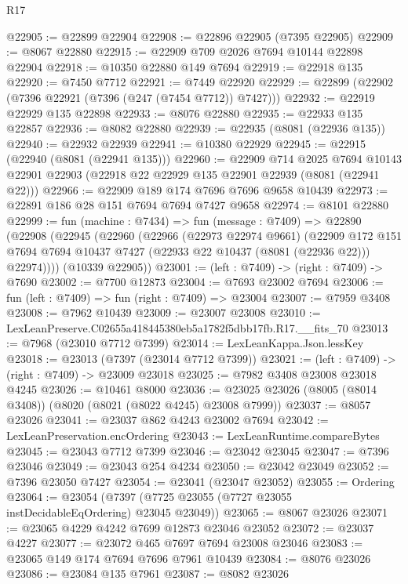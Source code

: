 \begin{lexlean}{R17}
\begin{coremodule}
@22905 := @22899 @22904
@22908 := @22896 @22905 (@7395 @22905)
@22909 := @8067 @22880
@22915 := @22909 @709 @2026 @7694 @10144 @22898 @22904
@22918 := @10350 @22880 @149 @7694
@22919 := @22918 @135
@22920 := @7450 @7712
@22921 := @7449 @22920
@22929 := @22899 (@22902 (@7396 @22921 (@7396 (@247 (@7454 @7712)) @7427)))
@22932 := @22919 @22929 @135 @22898
@22933 := @8076 @22880
@22935 := @22933 @135 @22857
@22936 := @8082 @22880
@22939 := @22935 (@8081 (@22936 @135))
@22940 := @22932 @22939
@22941 := @10380 @22929
@22945 := @22915 (@22940 (@8081 (@22941 @135)))
@22960 := @22909
    @714
    @2025
    @7694
    @10143
    @22901
    @22903
    (@22918 @22 @22929 @135 @22901 @22939 (@8081 (@22941 @22)))
@22966 := @22909 @189 @174 @7696 @7696 @9658 @10439
@22973 := @22891 @186 @28 @151 @7694 @7694 @7427 @9658
@22974 := @8101 @22880
@22999 := fun (machine : @7434) =>
  fun (message : @7409) =>
  @22890
    (@22908
      (@22945
        (@22960
          (@22966
            (@22973 @22974 @9661)
            (@22909
              @172
              @151
              @7694
              @7694
              @10437
              @7427
              (@22933 @22 @10437 (@8081 (@22936 @22)))
              @22974))))
      (@10339 @22905))
@23001 := (left : @7409) -> (right : @7409) -> @7690
@23002 := @7700 @12873
@23004 := @7693 @23002 @7694
@23006 := fun (left : @7409) => fun (right : @7409) => @23004
@23007 := @7959 @3408
@23008 := @7962 @10439
@23009 := @23007 @23008
@23010 := LexLeanPreserve.C02655a418445380eb5a1782f5dbb17fb.R17.__fits_70
@23013 := @7968 (@23010 @7712 @7399)
@23014 := LexLeanKappa.Json.lessKey
@23018 := @23013 (@7397 (@23014 @7712 @7399))
@23021 := (left : @7409) -> (right : @7409) -> @23009 @23018
@23025 := @7982 @3408 @23008 @23018 @4245
@23026 := @10461 @8000
@23036 := @23025 @23026 (@8005 (@8014 @3408)) (@8020 (@8021 (@8022 @4245) @23008 @7999))
@23037 := @8057 @23026
@23041 := @23037 @862 @4243 @23002 @7694
@23042 := LexLeanPreservation.encOrdering
@23043 := LexLeanRuntime.compareBytes
@23045 := @23043 @7712 @7399
@23046 := @23042 @23045
@23047 := @7396 @23046
@23049 := @23043 @254 @4234
@23050 := @23042 @23049
@23052 := @7396 @23050 @7427
@23054 := @23041 (@23047 @23052)
@23055 := Ordering
@23064 := @23054 (@7397 (@7725 @23055 (@7727 @23055 instDecidableEqOrdering) @23045 @23049))
@23065 := @8067 @23026
@23071 := @23065 @4229 @4242 @7699 @12873 @23046 @23052
@23072 := @23037 @4227
@23077 := @23072 @465 @7697 @7694 @23008 @23046
@23083 := @23065 @149 @174 @7694 @7696 @7961 @10439
@23084 := @8076 @23026
@23086 := @23084 @135 @7961
@23087 := @8082 @23026

\end{coremodule}
\end{lexlean}

